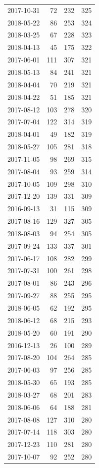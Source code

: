 \begin{tabular}{lrrr}
2017-10-31 & 72 & 232 & 325 \\
2018-05-22 & 86 & 253 & 324 \\
2018-03-25 & 67 & 228 & 323 \\
2018-04-13 & 45 & 175 & 322 \\
2017-06-01 & 111 & 307 & 321 \\
2018-05-13 & 84 & 241 & 321 \\
2018-04-04 & 70 & 219 & 321 \\
2018-04-22 & 51 & 185 & 321 \\
2017-08-12 & 103 & 278 & 320 \\
2017-07-04 & 122 & 314 & 319 \\
2018-04-01 & 49 & 182 & 319 \\
2018-05-27 & 105 & 281 & 318 \\
2017-11-05 & 98 & 269 & 315 \\
2017-08-04 & 93 & 259 & 314 \\
2017-10-05 & 109 & 298 & 310 \\
2017-12-20 & 139 & 331 & 309 \\
2016-09-13 & 31 & 115 & 309 \\
2017-08-16 & 129 & 327 & 305 \\
2018-08-03 & 94 & 254 & 305 \\
2017-09-24 & 133 & 337 & 301 \\
2017-06-17 & 108 & 282 & 299 \\
2017-07-31 & 100 & 261 & 298 \\
2017-08-01 & 86 & 243 & 296 \\
2017-09-27 & 88 & 255 & 295 \\
2018-06-05 & 62 & 192 & 295 \\
2018-06-12 & 68 & 215 & 293 \\
2018-05-20 & 60 & 191 & 290 \\
2016-12-13 & 26 & 100 & 289 \\
2017-08-20 & 104 & 264 & 285 \\
2017-06-03 & 97 & 256 & 285 \\
2018-05-30 & 65 & 193 & 285 \\
2018-03-27 & 68 & 201 & 283 \\
2018-06-06 & 64 & 188 & 281 \\
2017-08-08 & 127 & 310 & 280 \\
2017-07-14 & 118 & 303 & 280 \\
2017-12-23 & 110 & 281 & 280 \\
2017-10-07 & 92 & 252 & 280 \\

\end{tabular}
